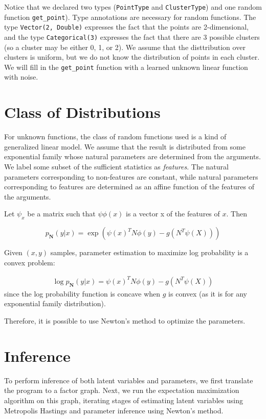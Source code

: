 \documentclass[proceed]{article}
\begin{document}
  Notice that we declared two types (\texttt{PointType} and \texttt{ClusterType})
  and one random function \texttt{get\_point}).
  Type annotations are necessary for random functions.  The type
  \texttt{Vector(2, Double)} expresses the fact that the points are 2-dimensional,
  and the type \texttt{Categorical(3)} expresses the fact that there are 3
  possible clusters (so a cluster may be either 0, 1, or 2).  We assume that
  the disttribution over clusters is uniform, but we do not know the distribution
  of points in each cluster.
  We will fill in the
  \texttt{get\_point} function with a learned unknown linear function with noise.

  \section{Class of Distributions}

    For unknown functions, the class of random functions used is a kind
    of generalized linear model.  We assume that the result
    is distributed from some exponential family whose natural
    parameters are determined from the arguments.  We label
    some subset of the sufficient statistics as \emph{features}.  The natural
    parameters corresponding to non-features are constant, while natural
    parameters corresponding to features are determined as an affine
    function of the features of the arguments.

    Let $\psi_x$ be a matrix such that $\psi \phi(x)$ is a vector x of the
    features of $x$.  Then

    $$p_{\mathbf{N}}(y | x) = \exp(\psi(x)^T N \phi(y) - g(N^T \psi(X)))$$

    Given $(x, y)$ samples, parameter estimation to maximize log probability is a convex
    problem:

    \begin{align*}
      \log p_{\mathbf{N}}(y | x) = \psi(x)^T N \phi(y) - g(N^T \psi(X))
    \end{align*}
    since the log probability function is concave when $g$ is convex (as it is
    for any exponential family distribution).

    Therefore, it is possible to use Newton's method to optimize the parameters.

  \section{Inference}

    To perform inference of both latent variables and parameters, we first
    translate the program to a factor graph.  Next, we run the
    expectation maximization algorithm on this graph, iterating stages of
    estimating latent variables using Metropolis Hastings and parameter
    inference using Newton's method.
\end{document}
